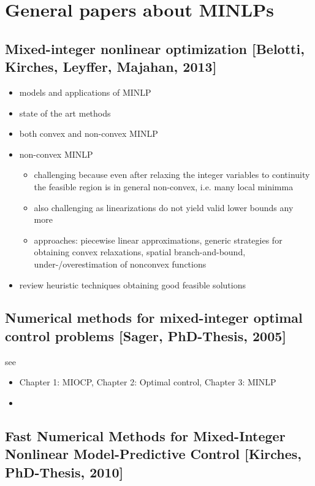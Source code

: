 \documentclass{article}
\begin{document}
\newpage
\section{General papers about MINLPs}
\subsection{Mixed-integer nonlinear optimization [Belotti, Kirches, Leyffer, Majahan, 2013]}
\begin{itemize}
\item models and applications of MINLP
\item state of the art methods
\item both convex and non-convex MINLP
\item non-convex MINLP
\begin{itemize}
\item challenging because even after relaxing the integer variables to continuity the feasible region is in general non-convex, i.e. many local minimma
\item also challenging as linearizations do not yield valid lower bounds any more
\item approaches: piecewise linear approximations, generic strategies for obtaining convex relaxations, spatial branch-and-bound, under-/overestimation of nonconvex functions
\end{itemize}
\item review heuristic techniques obtaining good feasible solutions
\end{itemize}
\subsection{Numerical methods for mixed-integer optimal control problems [Sager, PhD-Thesis, 2005]}
see \cite{sager2005numerical}
\begin{itemize}
\item Chapter 1: MIOCP, Chapter 2: Optimal control, Chapter 3: MINLP
\item 
\end{itemize}
\subsection{Fast Numerical Methods for Mixed-Integer Nonlinear Model-Predictive Control [Kirches, PhD-Thesis, 2010]}
\end{document}
